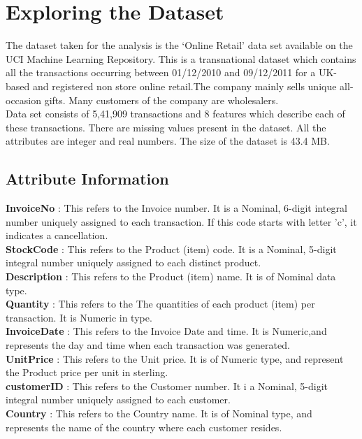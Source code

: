 \section{Exploring the Dataset}

The dataset taken for the analysis is the `Online Retail' data set available on the UCI Machine Learning Repository. This is a transnational dataset which contains all the transactions occurring between 01/12/2010 and 09/12/2011 for a UK-based and registered non store online retail.The company mainly sells unique all-occasion gifts. Many customers of the company are wholesalers.\\

Data set consists of 5,41,909 transactions and 8 features which describe each of these transactions. There are missing values present in the dataset. All the attributes are integer and real numbers. The size of the dataset is 43.4 MB.\\

\subsection{Attribute Information}

\textbf{InvoiceNo}    : This refers to the Invoice number. It is a Nominal, 6-digit integral number uniquely assigned to each transaction. If this code starts with letter 'c', it indicates a cancellation. \\
\textbf{StockCode}    : This refers to the Product (item) code. It is a Nominal, 5-digit integral number uniquely assigned to each distinct product.\\
\textbf{Description}  : This refers to the Product (item) name. It is of Nominal data type. \\
\textbf{Quantity}     : This refers to the The quantities of each product (item) per transaction. It is Numeric in type.\\
\textbf{InvoiceDate}  : This refers to the Invoice Date and time. It is Numeric,and represents the day and time when each transaction was generated. \\
\textbf{UnitPrice}    : This refers to the Unit price. It is of Numeric type, and represent the Product price per unit in sterling. \\
\textbf{customerID}   : This refers to the Customer number. It i a Nominal, 5-digit integral number uniquely assigned to each customer.\\
\textbf{Country}      : This refers to the Country name. It is of Nominal type, and represents the name of the country where each customer resides.\\

